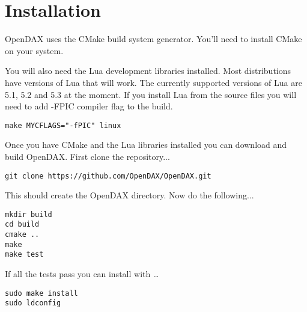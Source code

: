\section{Installation}

OpenDAX uses the CMake build system generator.  You'll need to install CMake
on your system.

You will also need the Lua development libraries installed.  Most 
distributions have versions of Lua that will work.  The currently supported
versions of Lua are 5.1, 5.2 and 5.3 at the moment.
If you install Lua from the source files you will need to add -FPIC 
compiler flag to the build.

\begin{verbatim}
make MYCFLAGS="-fPIC" linux
\end{verbatim}

Once you have CMake and the Lua libraries installed you can download and build
OpenDAX.  First clone the repository...

\begin{verbatim}
git clone https://github.com/OpenDAX/OpenDAX.git
\end{verbatim}

This should create the OpenDAX directory.  Now do the following...
\begin{verbatim}
mkdir build
cd build
cmake ..
make
make test
\end{verbatim}

If all the tests pass you can install with \ldots

\begin{verbatim}
sudo make install
sudo ldconfig
\end{verbatim}
